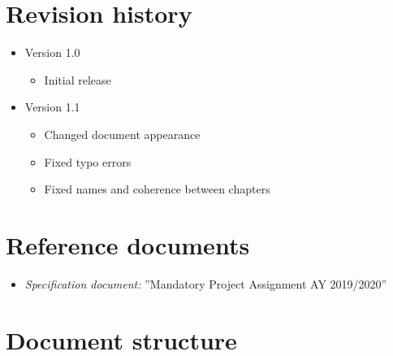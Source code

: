 		\section{Revision history}
			\begin{itemize}
				\item Version 1.0
					\begin{itemize}
						\item Initial release
					\end{itemize}
				\item Version 1.1
					\begin{itemize}
						\item Changed document appearance
						\item Fixed typo errors
						\item Fixed names and coherence between chapters
					\end{itemize}
			\end{itemize}
		\section{Reference documents}
			\begin{itemize}
				\item \textit{Specification document:} ''Mandatory Project Assignment AY 2019/2020''
			\end{itemize}
		\section{Document structure}

